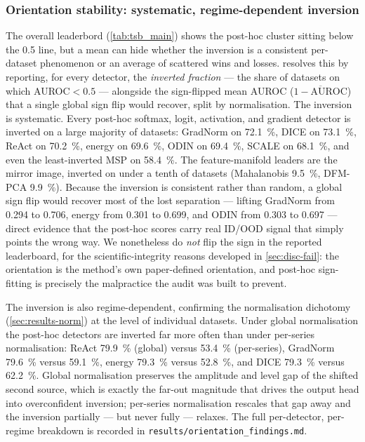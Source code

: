 \subsubsection{Orientation stability: systematic, regime-dependent inversion}\label{sec:results-orientation}
The overall leaderbord (\cref{tab:tsb_main}) shows the post-hoc cluster sitting
below the \num{0.5} line, but a mean can hide whether the inversion is a
consistent per-dataset phenomenon or an average of scattered wins and losses.
 resolves this by reporting, for every detector,
the \emph{inverted fraction} --- the share of datasets on which AUROC${}<0.5$ ---
alongside the sign-flipped mean AUROC ($\overline{1-\text{AUROC}}$) that a single
global sign flip would recover, split by normalisation. The inversion is
systematic. Every post-hoc softmax, logit, activation, and gradient detector is
inverted on a large majority of datasets: GradNorm on \SI{72.1}{\percent}, DICE on
\SI{73.1}{\percent}, ReAct on \SI{70.2}{\percent}, energy on \SI{69.6}{\percent},
ODIN on \SI{69.4}{\percent}, SCALE on \SI{68.1}{\percent}, and even the
least-inverted MSP on \SI{58.4}{\percent}. The feature-manifold leaders are the
mirror image, inverted on under a tenth of datasets (Mahalanobis
\SI{9.5}{\percent}, DFM-PCA \SI{9.9}{\percent}). Because the inversion is
consistent rather than random, a global sign flip would recover most of the lost
separation --- lifting GradNorm from \num{0.294} to \num{0.706}, energy from
\num{0.301} to \num{0.699}, and ODIN from \num{0.303} to \num{0.697} --- direct
evidence that the post-hoc scores carry real ID/OOD signal that simply points the
wrong way. We nonetheless do \emph{not} flip the sign in the reported leaderboard,
for the scientific-integrity reasons developed in \cref{sec:disc-fail}: the
orientation is the method's own paper-defined orientation, and post-hoc
sign-fitting is precisely the malpractice the audit was built to prevent.

The inversion is also regime-dependent, confirming the normalisation dichotomy
(\cref{sec:results-norm}) at the level of individual datasets. Under global
normalisation the post-hoc detectors are inverted far more often than under
per-series normalisation: ReAct \SI{79.9}{\percent} (global) versus
\SI{53.4}{\percent} (per-series), GradNorm \SI{79.6}{\percent} versus
\SI{59.1}{\percent}, energy \SI{79.3}{\percent} versus \SI{52.8}{\percent}, and
DICE \SI{79.3}{\percent} versus \SI{62.2}{\percent}. Global normalisation
preserves the amplitude and level gap of the shifted second source, which is
exactly the far-out magnitude that drives the output head into overconfident
inversion; per-series normalisation rescales that gap away and the inversion
partially --- but never fully --- relaxes. The full per-detector, per-regime
breakdown is recorded in \texttt{results/orientation\_findings.md}.

